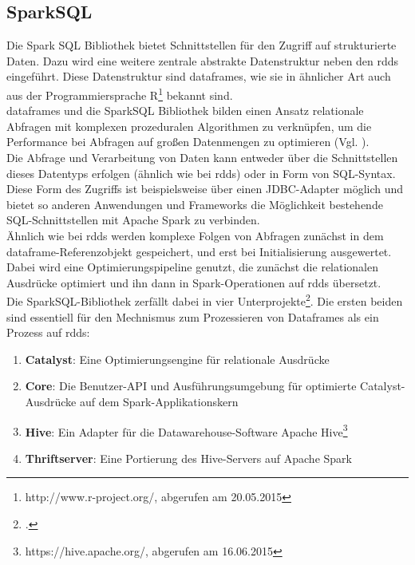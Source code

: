 \subsection{SparkSQL}
Die Spark SQL Bibliothek bietet Schnittstellen für den Zugriff auf strukturierte Daten. Dazu wird eine weitere zentrale abstrakte Datenstruktur neben den \glspl{rdd} eingeführt. Diese Datenstruktur sind \glspl{dataframe}, wie sie in ähnlicher Art auch aus der Programmiersprache R\footnote{http://www.r-project.org/, abgerufen am 20.05.2015} bekannt sind.\\

\Glspl{dataframe} und die SparkSQL Bibliothek bilden einen Ansatz relationale Abfragen mit komplexen prozeduralen Algorithmen zu verknüpfen, um die Performance bei Abfragen auf großen Datenmengen zu optimieren (Vgl. \cite{Armbrust:2015:SSR:2723372.2742797}).\\

Die Abfrage und Verarbeitung von Daten kann entweder über die Schnittstellen dieses Datentyps erfolgen (ähnlich wie bei \glspl{rdd}) oder in Form von SQL-Syntax.\\

Diese Form des Zugriffs ist beispielsweise über einen JDBC-Adapter möglich und bietet so anderen Anwendungen und Frameworks die Möglichkeit bestehende SQL-Schnittstellen mit Apache Spark zu verbinden.\\

Ähnlich wie bei \glspl{rdd} werden komplexe Folgen von Abfragen zunächst in dem \gls{dataframe}-Referenzobjekt gespeichert, und erst bei Initialisierung ausgewertet. Dabei wird eine Optimierungspipeline genutzt, die zunächst die relationalen Ausdrücke optimiert und ihn dann in Spark-Operationen auf \glspl{rdd} übersetzt.\\

Die SparkSQL-Bibliothek zerfällt dabei in vier Unterprojekte\footcite{https://github.com/apache/spark/tree/branch-1.3/sql, abgerufen am 16.06.2015}. Die ersten beiden sind essentiell für den Mechnismus zum Prozessieren von Dataframes als ein Prozess auf \glspl{rdd}:
\begin{enumerate}
	\item \textbf{Catalyst}: Eine Optimierungsengine für relationale Ausdrücke
	\item \textbf{Core}: Die Benutzer-API und Ausführungsumgebung für optimierte Catalyst-Ausdrücke auf dem Spark-Applikationskern
	\item \textbf{Hive}: Ein Adapter für die Datawarehouse-Software Apache Hive\footnote{https://hive.apache.org/, abgerufen am 16.06.2015}
	\item \textbf{Thriftserver}: Eine Portierung des Hive-Servers auf Apache Spark
\end{enumerate}

